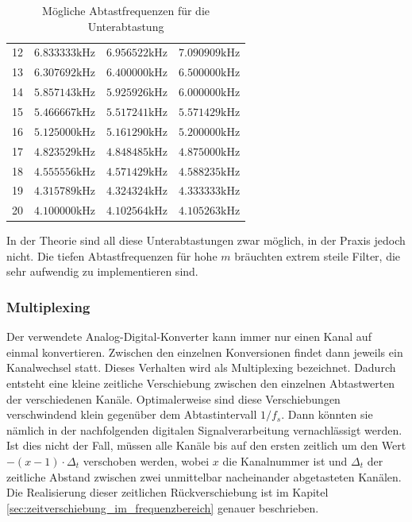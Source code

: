 \begin{table}
\begin{center}
\begin{tabular}{|p{}|p{}|p{}|p{}|}
12	& $6.833333 \mathrm{kHz}$	& $6.956522 \mathrm{kHz}$ 	& $7.090909 \mathrm{kHz}$\\
13	& $6.307692 \mathrm{kHz}$	& $6.400000 \mathrm{kHz}$ 	& $6.500000 \mathrm{kHz}$\\
14	& $5.857143 \mathrm{kHz}$	& $5.925926 \mathrm{kHz}$ 	& $6.000000 \mathrm{kHz}$\\
15	& $5.466667 \mathrm{kHz}$	& $5.517241 \mathrm{kHz}$ 	& $5.571429 \mathrm{kHz}$\\
16	& $5.125000 \mathrm{kHz}$	& $5.161290 \mathrm{kHz}$ 	& $5.200000 \mathrm{kHz}$\\
17	& $4.823529 \mathrm{kHz}$	& $4.848485 \mathrm{kHz}$ 	& $4.875000 \mathrm{kHz}$\\
18	& $4.555556 \mathrm{kHz}$	& $4.571429 \mathrm{kHz}$ 	& $4.588235 \mathrm{kHz}$\\
19	& $4.315789 \mathrm{kHz}$	& $4.324324 \mathrm{kHz}$ 	& $4.333333 \mathrm{kHz}$\\
20	& $4.100000 \mathrm{kHz}$	& $4.102564 \mathrm{kHz}$ 	& $4.105263 \mathrm{kHz}$\\
\hline
\end{tabular}
\caption{Mögliche Abtastfrequenzen für die Unterabtastung}
\label{table:abtastfrequenzen}
\end{center}
\end{table}

In der Theorie sind all diese Unterabtastungen zwar möglich, in der Praxis jedoch nicht. Die tiefen Abtastfrequenzen für hohe $m$ bräuchten extrem steile Filter, die sehr aufwendig zu implementieren sind.

\subsubsection{Multiplexing}\label{sec:multiplexing}
Der verwendete Analog-Digital-Konverter kann immer nur einen Kanal auf einmal konvertieren. Zwischen den einzelnen Konversionen findet dann jeweils ein Kanalwechsel statt. Dieses Verhalten wird als Multiplexing bezeichnet. Dadurch entsteht eine kleine zeitliche Verschiebung zwischen den einzelnen Abtastwerten der verschiedenen Kanäle. Optimalerweise sind diese Verschiebungen verschwindend klein gegenüber dem Abtastintervall $1/f_{s}$. Dann könnten sie nämlich in der nachfolgenden digitalen Signalverarbeitung vernachlässigt werden. Ist dies nicht der Fall, müssen alle Kanäle bis auf den ersten zeitlich um den Wert $-(x-1) \cdot \Delta_{t}$ verschoben werden, wobei $x$ die Kanalnummer ist und $\Delta_{t}$ der zeitliche Abstand zwischen zwei unmittelbar nacheinander abgetasteten Kanälen. Die Realisierung dieser zeitlichen Rückverschiebung ist im Kapitel \ref{sec:zeitverschiebung_im_frequenzbereich} genauer beschrieben.



